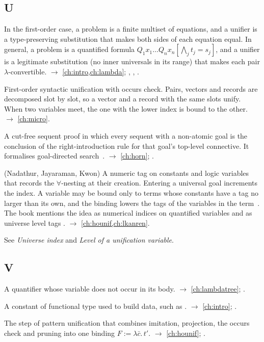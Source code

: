 \subsection*{U}
\begin{glossarylist}
\item[Unification problem, unifier] In the first-order case, a problem is a finite multiset of equations, and a
  unifier is a type-preserving substitution that makes both sides of each equation equal. In general, a problem
  is a quantified formula $Q_1x_1\dots Q_nx_n[\bigwedge_j t_j=s_j]$, and a unifier is a legitimate substitution
  (no inner universals in its range) that makes each pair $\lambda$-convertible.
  $\rightarrow$ \cref{ch:intro,ch:lambda}; , , .
\item[Unification (\micro{}), \texttt{=°}] First-order syntactic unification with occurs check. Pairs,
  vectors and records are decomposed slot by slot, so a vector and a record with the same slots unify. When two
  variables meet, the one with the lower index is bound to the other. $\rightarrow$ \cref{ch:micro}.
\item[Uniform proof] A cut-free sequent proof in which every sequent with a non-atomic goal is the conclusion of the
  right-introduction rule for that goal's top-level connective. It formalises goal-directed
  search~\cite{MillerNadathurPfenningScedrov1991}. $\rightarrow$ \cref{ch:horn}; .
\item[Universe index] (Nadathur, Jayaraman, Kwon) A numeric tag on constants and logic variables that records the
  $\forall$-nesting at their creation. Entering a universal goal increments the index. A variable may be bound only
  to terms whose constants have a tag no larger than its own, and the binding lowers the tags of the variables in
  the term~\cite{NadathurJayaramanKwon1995}. The book mentions the idea as numerical indices on quantified
  variables  and as universe level tags . $\rightarrow$ \cref{ch:hounif,ch:lkanren}.
\item[Universe level] See \emph{Universe index} and \emph{Level of a unification variable}.
\end{glossarylist}

\subsection*{V}
\begin{glossarylist}
\item[Vacuous quantifier] A quantifier whose variable does not occur in its body. $\rightarrow$
  \cref{ch:lambdatree}; .
\item[Value constructor] A constant of functional type used to build data, such as \lp{::}.
  $\rightarrow$ \cref{ch:intro}; .
\item[Variable elimination (patterns)] The step of pattern unification that combines imitation, projection, the
  occurs check and pruning into one binding $F:=\lambda\bar c.\,t'$. $\rightarrow$ \cref{ch:hounif}; .
\end{glossarylist}

